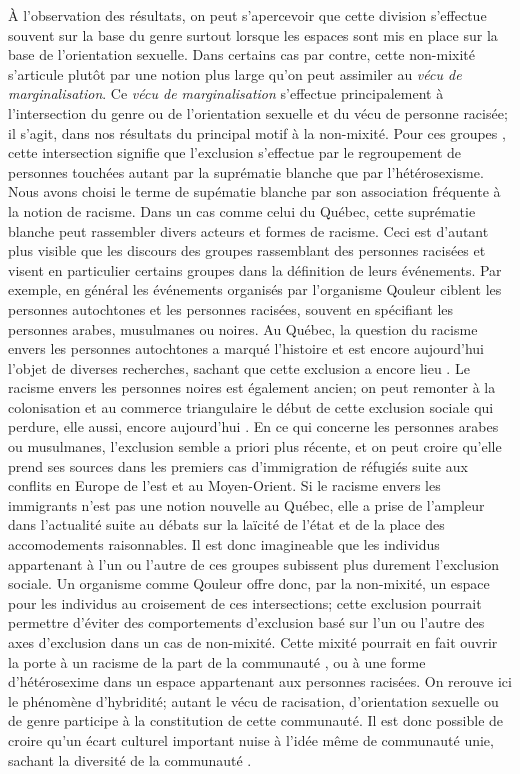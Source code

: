 À l'observation des résultats, on peut s'apercevoir que cette division s'effectue souvent sur la base du genre surtout lorsque les espaces sont mis en place sur la base de l'orientation sexuelle.
Dans certains cas par contre, cette non-mixité s'articule plutôt par une notion plus large qu'on peut assimiler au \emph{vécu de marginalisation}.
Ce \emph{vécu de marginalisation} s'effectue principalement à l'intersection du genre ou de l'orientation sexuelle et du vécu de personne racisée; il s'agit, dans nos résultats du principal motif à la non-mixité.
Pour ces groupes \lgbt{}, cette intersection signifie que l'exclusion s'effectue par le regroupement de personnes touchées autant par la suprématie blanche que par l'hétérosexisme.
Nous avons choisi le terme de supématie blanche par son association fréquente à la notion de racisme.
Dans un cas comme celui du Québec, cette suprématie blanche peut rassembler divers acteurs et formes de racisme.
Ceci est d'autant plus visible que les discours des groupes rassemblant des personnes racisées et \lgbt{} visent en particulier certains groupes dans la définition de leurs événements.
Par exemple, en général les événements organisés par l'organisme Qouleur ciblent les personnes autochtones et les personnes racisées, souvent en spécifiant les personnes arabes, musulmanes ou noires.
Au Québec, la question du racisme envers les personnes autochtones a marqué l'histoire et est encore aujourd'hui l'objet de diverses recherches, sachant que cette exclusion a encore lieu \missref{}.
Le racisme envers les personnes noires est également ancien; on peut remonter à la colonisation et au commerce triangulaire le début de cette exclusion sociale qui perdure, elle aussi, encore aujourd'hui \missref{}.
En ce qui concerne les personnes arabes ou musulmanes, l'exclusion semble a priori plus récente, et on peut croire qu'elle prend ses sources dans les premiers cas d'immigration de réfugiés suite aux conflits en Europe de l'est et au Moyen-Orient.
Si le racisme envers les immigrants n'est pas une notion nouvelle au Québec, elle a prise de l'ampleur dans l'actualité suite au débats sur la laïcité de l'état et de la place des accomodements raisonnables.
Il est donc imagineable que les individus \lgbt{} appartenant à l'un ou l'autre de ces groupes subissent plus durement l'exclusion sociale.
Un organisme comme Qouleur offre donc, par la non-mixité, un espace pour les individus au croisement de ces intersections;  cette exclusion pourrait permettre d'éviter des comportements d'exclusion basé sur l'un ou l'autre des axes d'exclusion dans un cas de non-mixité.
Cette mixité pourrait en fait ouvrir la porte à un racisme de la part de la communauté \lgbt{}, ou à une forme d'hétérosexime dans un espace appartenant aux personnes racisées.
On rerouve ici le phénomène d'hybridité; autant le vécu de racisation, d'orientation sexuelle ou de genre participe à la constitution de cette communauté.
Il est donc possible de croire qu'un écart culturel important nuise à l'idée même de communauté unie, sachant la diversité de la communauté \lgbt{}.

